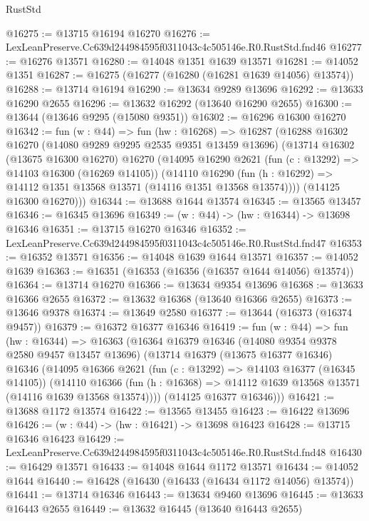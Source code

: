 \begin{lexlean}{RustStd}
\begin{coremodule}
@16275 := @13715 @16194 @16270
@16276 := LexLeanPreserve.Cc639d244984595f0311043c4c505146e.R0.RustStd.fnd46
@16277 := @16276 @13571
@16280 := @14048 @1351 @1639 @13571
@16281 := @14052 @1351
@16287 := @16275 (@16277 (@16280 (@16281 @1639 @14056) @13574))
@16288 := @13714 @16194
@16290 := @13634 @9289 @13696
@16292 := @13633 @16290 @2655
@16296 := @13632 @16292 (@13640 @16290 @2655)
@16300 := @13644 (@13646 @9295 (@15080 @9351))
@16302 := @16296 @16300 @16270
@16342 := fun (w : @44) =>
  fun (hw : @16268) =>
  @16287
    (@16288
      @16302
      @16270
      (@14080 @9289 @9295 @2535 @9351 @13459 @13696)
      (@13714
        @16302
        (@13675 @16300 @16270)
        @16270
        (@14095
          @16290
          @2621
          (fun (c : @13292) => @14103 @16300 (@16269 @14105))
          (@14110
            @16290
            (fun (h : @16292) => @14112 @1351 @13568 @13571 (@14116 @1351 @13568 @13574))))
        (@14125 @16300 @16270)))
@16344 := @13688 @1644 @13574
@16345 := @13565 @13457
@16346 := @16345 @13696
@16349 := (w : @44) -> (hw : @16344) -> @13698 @16346
@16351 := @13715 @16270 @16346
@16352 := LexLeanPreserve.Cc639d244984595f0311043c4c505146e.R0.RustStd.fnd47
@16353 := @16352 @13571
@16356 := @14048 @1639 @1644 @13571
@16357 := @14052 @1639
@16363 := @16351 (@16353 (@16356 (@16357 @1644 @14056) @13574))
@16364 := @13714 @16270
@16366 := @13634 @9354 @13696
@16368 := @13633 @16366 @2655
@16372 := @13632 @16368 (@13640 @16366 @2655)
@16373 := @13646 @9378
@16374 := @13649 @2580
@16377 := @13644 (@16373 (@16374 @9457))
@16379 := @16372 @16377 @16346
@16419 := fun (w : @44) =>
  fun (hw : @16344) =>
  @16363
    (@16364
      @16379
      @16346
      (@14080 @9354 @9378 @2580 @9457 @13457 @13696)
      (@13714
        @16379
        (@13675 @16377 @16346)
        @16346
        (@14095
          @16366
          @2621
          (fun (c : @13292) => @14103 @16377 (@16345 @14105))
          (@14110
            @16366
            (fun (h : @16368) => @14112 @1639 @13568 @13571 (@14116 @1639 @13568 @13574))))
        (@14125 @16377 @16346)))
@16421 := @13688 @1172 @13574
@16422 := @13565 @13455
@16423 := @16422 @13696
@16426 := (w : @44) -> (hw : @16421) -> @13698 @16423
@16428 := @13715 @16346 @16423
@16429 := LexLeanPreserve.Cc639d244984595f0311043c4c505146e.R0.RustStd.fnd48
@16430 := @16429 @13571
@16433 := @14048 @1644 @1172 @13571
@16434 := @14052 @1644
@16440 := @16428 (@16430 (@16433 (@16434 @1172 @14056) @13574))
@16441 := @13714 @16346
@16443 := @13634 @9460 @13696
@16445 := @13633 @16443 @2655
@16449 := @13632 @16445 (@13640 @16443 @2655)

\end{coremodule}
\end{lexlean}
